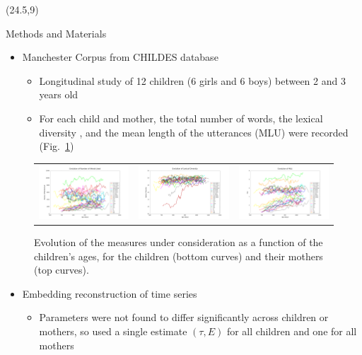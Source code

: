 \documentclass[final]{beamer}
\begin{document}
\begin{frame}{}
\begin{textblock}{34}(24.5,9)
\begin{block}{Methods and Materials}
\begin{itemize}
\item \text{ }Manchester Corpus \cite{MacWhinney14} from CHILDES database \cite{Theakston01}
\begin{itemize}
\item \text{ }Longitudinal study of 12 children (6 girls and 6 boys) between 2 and 3 years old
\item \text{ }For each child and mother, the total number of words, the lexical diversity \cite{Moscoso14}, and the mean length of the utterances (MLU) were recorded (Fig.~\ref{fig:evolution})
\end{itemize}
\end{itemize}
\begin{figure}
\begin{tabular}{ccc}
\includegraphics[width=.325\textwidth]{nwords_evolution.png} &
\includegraphics[width=.325\textwidth]{lexical_evolution.png} &
\includegraphics[width=.325\textwidth]{syntactic_evolution.png}
\end{tabular}
\caption{Evolution of the measures under consideration as a function of the children's ages, for the children (bottom curves) and their mothers (top curves).}
\label{fig:evolution}
\end{figure}
\begin{itemize}
\item \text{ }Embedding reconstruction of time series
\begin{itemize}
\item \text{ }Parameters were not found to differ significantly across children or mothers, so used a single estimate $(\tau, E)$ for all children and one for all mothers

\end{itemize}
\end{itemize}
\end{block}
\end{textblock}
\end{frame}
\end{document}

